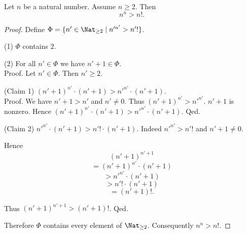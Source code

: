 \begin{forthel}
  \begin{proposition}
    Let $n$ be a natural number.
    Assume $n \geq 2$.
    Then \[ n^{n} > n!. \]
  \end{proposition}
  \begin{proof}
    Define $\Phi = \{ n' \in \Nat_{\geq 2} \mid n'^{n'} > n'! \}$.

    (1) $\Phi$ contains $2$.

    (2) For all $n' \in \Phi$ we have $n' + 1 \in \Phi$. \\
    Proof.
      Let $n' \in \Phi$.
      Then $n' \geq 2$.

      (Claim 1) $(n' + 1)^{n'} \cdot (n' + 1) > n'^{n'} \cdot (n' + 1)$. \\
      Proof.
        We have $n' + 1 > n'$ and $n' \neq 0$.
        Thus $(n' + 1)^{n'} > n'^{n'}$.
        $n' + 1$ is nonzero.
        Hence $(n' + 1)^{n'} \cdot (n' + 1) > n'^{n'} \cdot (n' + 1)$.
      Qed.

      (Claim 2) $n'^{n'} \cdot (n' + 1) > n'! \cdot (n' + 1)$.
      Indeed $n'^{n'} > n'!$ and $n' + 1 \neq 0$.

      Hence
      \[  (n' + 1)^{n' + 1}                 \]
      \[    = (n' + 1)^{n'} \cdot (n' + 1)  \]
      \[    > n'^{n'} \cdot (n' + 1)        \]
      \[    > n'! \cdot (n' + 1)            \]
      \[    = (n' + 1)!.                    \]

      Thus $(n' + 1)^{n' + 1} > (n' + 1)!$.
    Qed.

    Therefore $\Phi$ contains every element of $\Nat_{\geq 2}$.
    Consequently $n^{n} > n!$.
  \end{proof}
\end{forthel}

